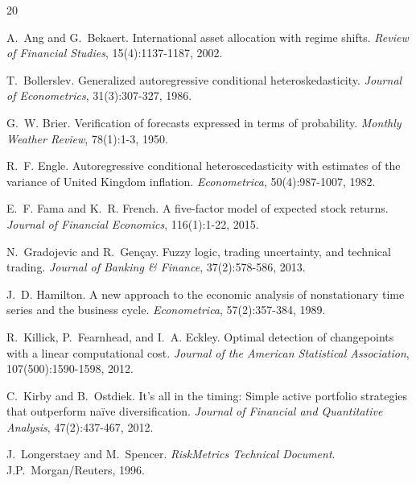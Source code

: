 \documentclass[11pt]{article}
\begin{document}
\begin{thebibliography}{20}

A.~Ang and G.~Bekaert.
\newblock International asset allocation with regime shifts.
\newblock \emph{Review of Financial Studies}, 15(4):1137-1187, 2002.

T.~Bollerslev.
\newblock Generalized autoregressive conditional heteroskedasticity.
\newblock \emph{Journal of Econometrics}, 31(3):307-327, 1986.

G.~W. Brier.
\newblock Verification of forecasts expressed in terms of probability.
\newblock \emph{Monthly Weather Review}, 78(1):1-3, 1950.

R.~F. Engle.
\newblock Autoregressive conditional heteroscedasticity with estimates
  of the variance of {United Kingdom} inflation.
\newblock \emph{Econometrica}, 50(4):987-1007, 1982.

E.~F. Fama and K.~R. French.
\newblock A five-factor model of expected stock returns.
\newblock \emph{Journal of Financial Economics}, 116(1):1-22, 2015.

N.~Gradojevic and R.~Gen\c{c}ay.
\newblock Fuzzy logic, trading uncertainty, and technical trading.
\newblock \emph{Journal of Banking \& Finance}, 37(2):578-586, 2013.

J.~D. Hamilton.
\newblock A new approach to the economic analysis of nonstationary time
  series and the business cycle.
\newblock \emph{Econometrica}, 57(2):357-384, 1989.

R.~Killick, P.~Fearnhead, and I.~A. Eckley.
\newblock Optimal detection of changepoints with a linear computational
  cost.
\newblock \emph{Journal of the American Statistical Association},
  107(500):1590-1598, 2012.

C.~Kirby and B.~Ostdiek.
\newblock It's all in the timing: Simple active portfolio strategies
  that outperform na\"ive diversification.
\newblock \emph{Journal of Financial and Quantitative Analysis},
  47(2):437-467, 2012.

J.~Longerstaey and M.~Spencer.
\newblock \emph{RiskMetrics Technical Document}.
\newblock J.P.~Morgan/Reuters, 1996.


\end{thebibliography}
\end{document}
